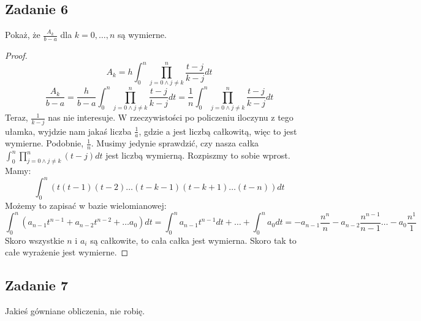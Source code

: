 \documentclass[a4paper]{article}
\begin{document}
\subsection*{Zadanie 6}
Pokaż, że $\frac{A_k}{b-a}$ dla $k=0,\dots,n$ są wymierne.\\
\begin{proof}
$$A_k=h \int_0^n  \prod_{j=0 \wedge j\neq k}^n \frac{t - j}{k - j} dt$$
$$\frac{A_k}{b-a} = \frac{h}{b-a} \int_0^n  \prod_{j=0 \wedge j\neq k}^n \frac{t - j}{k - j} dt = \frac{1}{n} \int_0^n  \prod_{j=0 \wedge j\neq k}^n \frac{t - j}{k - j} dt $$
Teraz, $\frac{1}{k-j}$ nas nie interesuje. W rzeczywistości po policzeniu iloczynu z tego ułamka, wyjdzie nam jakaś liczba $\frac{1}{a}$, gdzie a jest liczbą całkowitą, więc to jest wymierne. Podobnie, $\frac{1}{n}$. Musimy jedynie sprawdzić, czy nasza całka $ \int_0^n  \prod_{j=0 \wedge j\neq k}^n (t - j) dt$ jest liczbą wymierną.
Rozpiszmy to sobie wprost. Mamy:
$$\int_0^n \left( t(t-1)(t-2)\dots(t-k-1)(t-k+1)\dots(t-n) \right) dt$$
Możemy to zapisać w bazie wielomianowej:
$$\int_0^n \left( a_{n-1} t^{n-1} + a_{n-2} t^{n-2} + \dots a_0 \right) dt= \int_0^n a_{n-1}t^{n-1} dt+\dots + \int_0^n a_0 dt= -a_{n-1}\frac{n^n}{n} -a_{n-2}\frac{n^{n-1}}{n-1} \dots -a_0\frac{n^1}{1}$$
Skoro wszystkie $n$ i $a_i$ są całkowite, to cała całka jest wymierna. Skoro tak to całe wyrażenie jest wymierne.
\end{proof}

\subsection*{Zadanie 7}
Jakieś gówniane obliczenia, nie robię.
\end{document}

